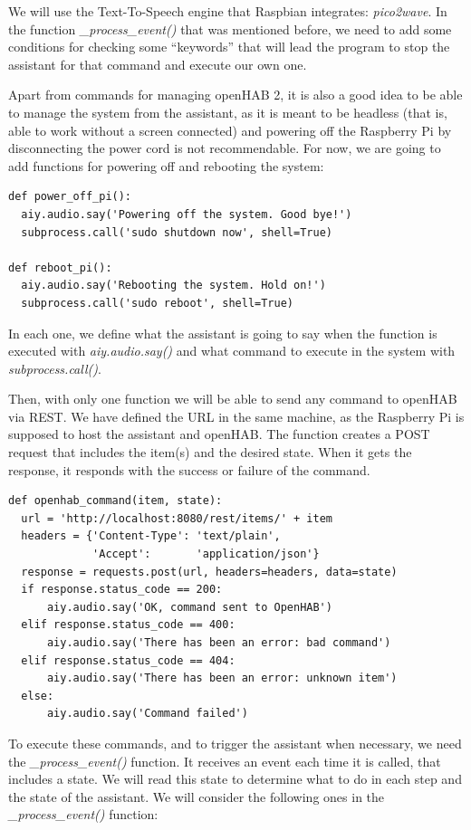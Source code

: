 We will use the Text-To-Speech engine that Raspbian integrates: \textit{pico2wave}. In the function \textit{\_process\_event()} that
was mentioned before, we need to add some conditions for checking some “keywords” that will lead the program to stop the assistant
for that command and execute our own one.

Apart from commands for managing openHAB 2, it is also a good idea to be able to manage the system from the assistant, as it is
meant to be headless (that is, able to work without a screen connected) and powering off the Raspberry Pi by disconnecting the
power cord is not recommendable. For now, we are going to add functions for powering off and rebooting the system:

\begin{lstlisting}[style=PythonCode]
def power_off_pi():
  aiy.audio.say('Powering off the system. Good bye!')
  subprocess.call('sudo shutdown now', shell=True)

def reboot_pi():
  aiy.audio.say('Rebooting the system. Hold on!')
  subprocess.call('sudo reboot', shell=True)
\end{lstlisting}

In each one, we define what the assistant is going to say when the function is executed with \textit{aiy.audio.say()} and what
command to execute in the system with \textit{subprocess.call()}.

Then, with only one function we will be able to send any command to openHAB via REST. We have defined the URL in the same machine,
as the Raspberry Pi is supposed to host the assistant and openHAB. The function creates a POST request that includes the item(s)
and the desired state. When it gets the response, it responds with the success or failure of the command.

\begin{lstlisting}[style=PythonCode]
def openhab_command(item, state):
  url = 'http://localhost:8080/rest/items/' + item
  headers = {'Content-Type': 'text/plain',
             'Accept':       'application/json'}
  response = requests.post(url, headers=headers, data=state)
  if response.status_code == 200:
      aiy.audio.say('OK, command sent to OpenHAB')
  elif response.status_code == 400:
      aiy.audio.say('There has been an error: bad command')
  elif response.status_code == 404:
      aiy.audio.say('There has been an error: unknown item')
  else:
      aiy.audio.say('Command failed')
\end{lstlisting}

To execute these commands, and to trigger the assistant when necessary, we need the \textit{\_process\_event()} function. It receives
an event each time it is called, that includes a state. We will read this state to determine what to do in each step and the state
of the assistant. We will consider the following ones in the\textit{ \_process\_event()} function:

